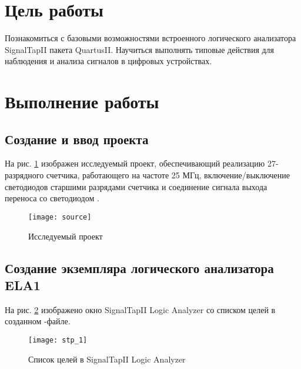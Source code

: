 





\tableofcontents
\listoffigures
\newpage

\section{Цель работы}

Познакомиться с базовыми возможностями встроенного логического анализатора SignalTapII пакета QuartusII. Научиться выполнять типовые действия для наблюдения и анализа сигналов в цифровых устройствах.

\section{Выполнение работы}

\subsection{Создание и ввод проекта}

На рис. \ref{fig:source} изображен исследуемый проект, обеспечивающий реализацию 27-разрядного счетчика, работающего на частоте 25 МГц, включение/выключение светодиодов  старшими разрядами счетчика и соединение сигнала выхода переноса  со светодиодом .

\begin{figure}[H]
	\begin{center}
		\texttt{[image: source]}
		\caption{Исследуемый проект}
		\label{fig:source}
	\end{center}
\end{figure}
\vspace{-1cm}

\subsection{Создание экземпляра логического анализатора ELA1}

На рис. \ref{fig:stp_1} изображено окно SignalTapII Logic Analyzer со списком целей в созданном -файле.
\vspace{-0.5cm}
\begin{figure}[H]
	\begin{center}
		\texttt{[image: stp\_1]}
		\caption{Список целей в SignalTapII Logic Analyzer}
		\label{fig:stp_1}
	\end{center}
\end{figure}

